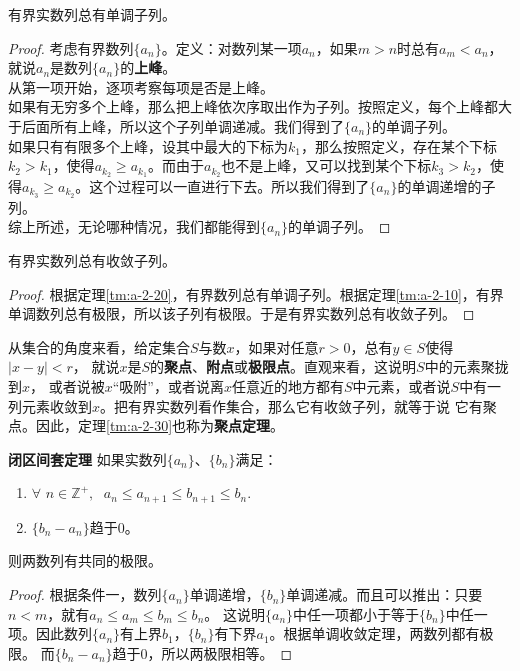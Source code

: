 \documentclass[12pt,UTF8]{ctexbook}
\begin{document}
\begin{appendix}
\begin{tm}\label{tm:a-2-20}
    有界实数列总有单调子列。
\end{tm}
\begin{proof}
    考虑有界数列$\{a_n\}$。定义：对数列某一项$a_n$，如果$m>n$时总有$a_m < a_n$，就说$a_n$是数列$\{a_n\}$的\textbf{上峰}。\\
    从第一项开始，逐项考察每项是否是上峰。\\
    如果有无穷多个上峰，那么把上峰依次序取出作为子列。按照定义，每个上峰都大于后面所有上峰，所以这个子列单调递减。我们得到了$\{a_n\}$的单调子列。\\
    如果只有有限多个上峰，设其中最大的下标为$k_1$，那么按照定义，存在某个下标$k_2 > k_1$，使得$a_{k_2} \geqslant a_{k_1}$。而由于$a_{k_2}$也不是上峰，又可以找到某个下标$k_3 > k_2$，使得$a_{k_3} \geqslant a_{k_2}$。这个过程可以一直进行下去。所以我们得到了$\{a_n\}$的单调递增的子列。\\
    综上所述，无论哪种情况，我们都能得到$\{a_n\}$的单调子列。
\end{proof}

\begin{tm}\label{tm:a-2-30}
    有界实数列总有收敛子列。
\end{tm}
\begin{proof}
    根据定理\ref{tm:a-2-20}，有界数列总有单调子列。根据定理\ref{tm:a-2-10}，有界单调数列总有极限，所以该子列有极限。于是有界实数列总有收敛子列。
\end{proof}

从集合的角度来看，给定集合$S$与数$x$，如果对任意$r>0$，总有$y\in S$使得$|x - y| < r$，
就说$x$是$S$的\textbf{聚点}、\textbf{附点}或\textbf{极限点}。直观来看，这说明$S$中的元素聚拢到$x$，
或者说被$x$“吸附”，或者说离$x$任意近的地方都有$S$中元素，或者说$S$中有一列元素收敛到$x$。把有界实数列看作集合，那么它有收敛子列，就等于说
它有聚点。因此，定理\ref{tm:a-2-30}也称为\textbf{聚点定理}。

\begin{tm}\textbf{闭区间套定理}\label{tm:a-2-40}
    如果实数列$\{a_n\}$、$\{b_n\}$满足：
    \begin{enumerate}
        \item $\forall\,\, n\in\mathbb{Z}^+, \;\,\, a_n \leqslant a_{n+1} \leqslant b_{n+1} \leqslant b_n.$
        \item $\{b_n - a_n\}$趋于$0$。
    \end{enumerate}
    则两数列有共同的极限。
\end{tm}
\begin{proof}
    根据条件一，数列$\{a_n\}$单调递增，$\{b_n\}$单调递减。而且可以推出：只要$n<m$，就有$a_n \leqslant a_{m} \leqslant b_{m} \leqslant b_n$。
    这说明$\{a_n\}$中任一项都小于等于$\{b_n\}$中任一项。因此数列$\{a_n\}$有上界$b_1$，$\{b_n\}$有下界$a_1$。根据单调收敛定理，两数列都有极限。
    而$\{b_n - a_n\}$趋于$0$，所以两极限相等。
\end{proof}


\end{appendix}
\end{document}
